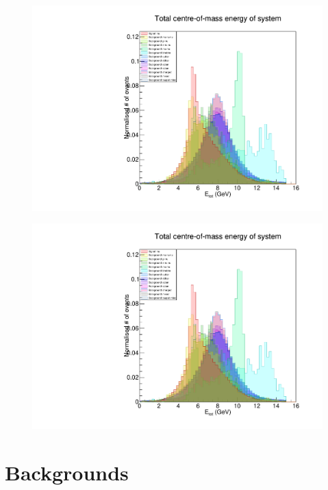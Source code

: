 \documentclass[12pt]{thesis}  %
\begin{document}
\begin{figure}[h]
\centering
\begin{minipage}{.5\textwidth}
  \centering
  \includegraphics[width=\linewidth]{images/stack/stack_cut6_totalCM_E.pdf}
  \label{fig:test1}
\end{minipage}%
\begin{minipage}{.5\textwidth}
  \centering
  \includegraphics[width=\linewidth]{images/stack/stack_cut6_totalCM_E.pdf}
  \label{fig:test2}
\end{minipage}
\end{figure}


\pagebreak

\section{Backgrounds}
\end{document}
